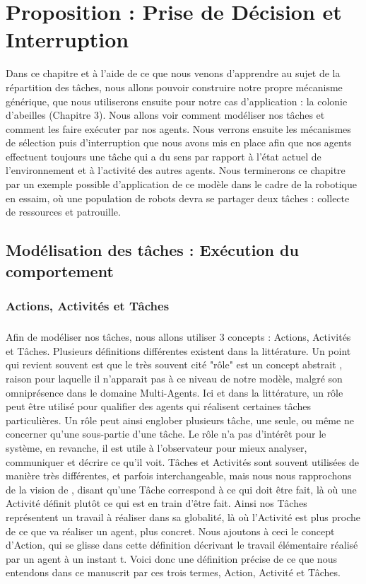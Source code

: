 \chapter{Proposition : Prise de Décision et Interruption}
	Dans ce chapitre et à l'aide de ce que nous venons d'apprendre au sujet de la répartition des tâches, nous allons pouvoir construire notre propre mécanisme générique, que nous utiliserons ensuite pour notre cas d'application : la colonie d'abeilles (Chapitre 3). Nous allons voir comment modéliser nos tâches et comment les faire exécuter par nos agents. Nous verrons ensuite les mécanismes de sélection puis d'interruption que nous avons mis en place afin que nos agents effectuent toujours une tâche qui a du sens par rapport à l'état actuel de l'environnement et à l'activité des autres agents. Nous terminerons ce chapitre par un exemple possible d'application de ce modèle dans le cadre de la robotique en essaim, où une population de robots devra se partager deux tâches : collecte de ressources et patrouille.
	
	\section{Modélisation des tâches : Exécution du comportement}	
	
		\subsection{Actions, Activités et Tâches}
		\paragraph{}
			Afin de modéliser nos tâches, nous allons utiliser 3 concepts : Actions, Activités et Tâches. Plusieurs définitions différentes existent dans la littérature. Un point qui revient souvent est que le très souvent cité "rôle" est un concept abstrait \cite{ferber_eta-model_1998, wooldridge_methodology_1999, campbell_multi-agent_2011}, raison pour laquelle il n'apparait pas à ce niveau de notre modèle, malgré son omniprésence dans le domaine Multi-Agents. Ici et dans la littérature, un rôle peut être utilisé pour qualifier des agents qui réalisent certaines tâches particulières. Un rôle peut ainsi englober plusieurs tâche, une seule, ou même ne concerner qu'une sous-partie d'une tâche. Le rôle n'a pas d'intérêt pour le système, en revanche, il est utile à l'observateur pour mieux analyser, communiquer et décrire ce qu'il voit. Tâches et Activités sont souvent utilisées de manière très différentes, et parfois interchangeable, mais nous nous rapprochons de la vision de \cite{krieger_call_2000}, disant qu'une Tâche correspond à ce qui doit être fait, là où une Activité définit plutôt ce qui est en train d'être fait. Ainsi nos Tâches représentent un travail à réaliser dans sa globalité, là où l'Activité est plus proche de ce que va réaliser un agent, plus concret. Nous ajoutons à ceci le concept d'Action, qui se glisse dans cette définition décrivant le travail élémentaire réalisé par un agent à un instant t. Voici donc une définition précise de ce que nous entendons dans ce manuscrit par ces trois termes, Action, Activité et Tâches.
			
